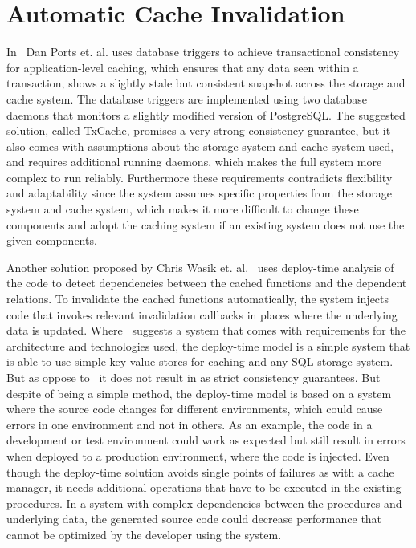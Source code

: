 \section{Automatic Cache Invalidation}

In~\cite{paper:liskov} Dan Ports et. al. uses database triggers to achieve transactional consistency for application-level caching, which ensures that any data seen within a transaction, shows a slightly stale but consistent snapshot across the storage and cache system. The database triggers are implemented using two database daemons that monitors a slightly modified version of PostgreSQL. The suggested solution, called TxCache, promises a very strong consistency guarantee, but it also comes with assumptions about the storage system and cache system used, and requires additional running daemons, which makes the full system more complex to run reliably. Furthermore these requirements contradicts flexibility and adaptability since the system assumes specific properties from the storage system and cache system, which makes it more difficult to change these components and adopt the caching system if an existing system does not use the given components.

Another solution proposed by Chris Wasik et. al.~\cite{paper:deploy-time} uses deploy-time analysis of the code to detect dependencies between the cached functions and the dependent relations. To invalidate the cached functions automatically, the system injects code that invokes relevant invalidation callbacks in places where the underlying data is updated. Where~\cite{paper:liskov} suggests a system that comes with requirements for the architecture and technologies used, the deploy-time model is a simple system that is able to use simple key-value stores for caching and any SQL storage system. But as oppose to~\cite{paper:liskov} it does not result in as strict consistency guarantees. But despite of being a simple method, the deploy-time model is based on a system where the source code changes for different environments, which could cause errors in one environment and not in others. As an example, the code in a development or test environment could work as expected but still result in errors when deployed to a production environment, where the code is injected. Even though the deploy-time solution avoids single points of failures as with a cache manager, it needs additional operations that have to be executed in the existing procedures. In a system with complex dependencies between the procedures and underlying data, the generated source code could decrease performance that cannot be optimized by the developer using the system.

